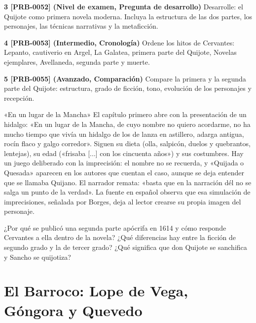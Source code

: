 \documentclass{book}
\begin{document}
\begin{tcolorbox}[title={Ejercicios}, studiumworked, breakable]
\noindent\textbf{3 [PRB-0052] (Nivel de examen, Pregunta de desarrollo)}
Desarrolle: el Quijote como primera novela moderna. Incluya la estructura de las dos partes, los personajes, las técnicas narrativas y la metaficción.


\noindent\textbf{4 [PRB-0053] (Intermedio, Cronología)}
Ordene los hitos de Cervantes: Lepanto, cautiverio en Argel, La Galatea, primera parte del Quijote, Novelas ejemplares, Avellaneda, segunda parte y muerte.


\noindent\textbf{5 [PRB-0055] (Avanzado, Comparación)}
Compare la primera y la segunda parte del Quijote: estructura, grado de ficción, tono, evolución de los personajes y recepción.

\end{tcolorbox}

\begin{tcolorbox}[title={Autoficha}, studiumcheck, breakable]

«En un lugar de la Mancha»
El capítulo primero abre con la presentación de un hidalgo: «En un lugar de la Mancha, de cuyo nombre no quiero acordarme, no ha mucho tiempo que vivía un hidalgo de los de lanza en astillero, adarga antigua, rocín flaco y galgo corredor». Siguen su dieta (olla, salpicón, duelos y quebrantos, lentejas), su edad («frisaba [...] con los cincuenta años») y sus costumbres. Hay un juego deliberado con la imprecisión: el nombre no se recuerda, y «Quijada o Quesada» aparecen en los autores que cuentan el caso, aunque se deja entender que se llamaba Quijano. El narrador remata: «basta que en la narración dél no se salga un punto de la verdad». La fuente en español observa que esa simulación de imprecisiones, señalada por Borges, deja al lector crearse su propia imagen del personaje.


¿Por qué se publicó una segunda parte apócrifa en 1614 y cómo responde Cervantes a ella dentro de la novela? ¿Qué diferencias hay entre la ficción de segundo grado y la de tercer grado? ¿Qué significa que don Quijote se sanchifica y Sancho se quijotiza?

\end{tcolorbox}

\chapter{El Barroco: Lope de Vega, Góngora y Quevedo}
\label{chap:lit-07}
\end{document}
